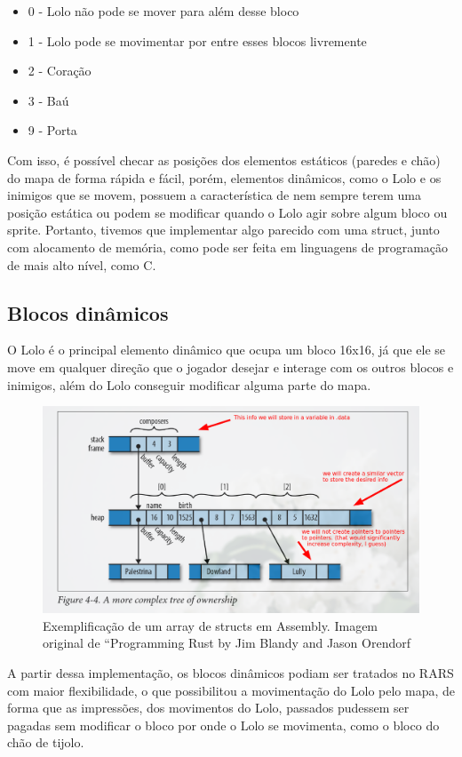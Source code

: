 \documentclass[10pt, conference, compsocconf]{IEEEtran}
\begin{document}
{{\begin{itemize}
    \item 0 - Lolo não pode se mover para além desse bloco
    \item 1 - Lolo pode se movimentar por entre esses blocos livremente
    \item 2 - Coração
    \item 3 - Baú
    \item 9 - Porta
\end{itemize}

Com isso, é possível checar as posições dos elementos estáticos (paredes e chão)
do mapa de forma rápida e fácil, porém, elementos dinâmicos, como o Lolo e os
inimigos que se movem, possuem a característica de nem sempre terem uma posição
estática ou podem se modificar quando o Lolo agir sobre algum bloco ou sprite.
Portanto, tivemos que implementar algo parecido com uma struct, junto com
alocamento de memória, como pode ser feita em linguagens de programação de mais
alto nível, como C.
}

\subsection{Blocos dinâmicos}{
\label{sec:MIPS}
O Lolo é o principal elemento dinâmico que ocupa um
bloco 16x16, já que ele se move em qualquer direção
que o jogador desejar e interage com os outros blocos
e inimigos, além do Lolo conseguir modificar alguma
parte do mapa.

}

\begin{figure}[htb]
  \begin{center}
   \includegraphics[width=1.0\linewidth]{./Figures/image_8.png}
  \end{center}
  \caption{Exemplificação de um array de structs
em Assembly. Imagem original de “Programming
Rust by Jim Blandy and Jason Orendorf}
  \label{fig:01}
\end{figure}

A partir dessa implementação, os blocos dinâmicos podiam ser tratados no RARS
com maior flexibilidade, o que possibilitou a movimentação do Lolo pelo mapa, de
forma que as impressões, dos movimentos do Lolo, passados pudessem ser pagadas
sem modificar o bloco por onde o Lolo se movimenta, como o bloco do chão de
tijolo.
}
\end{document}
